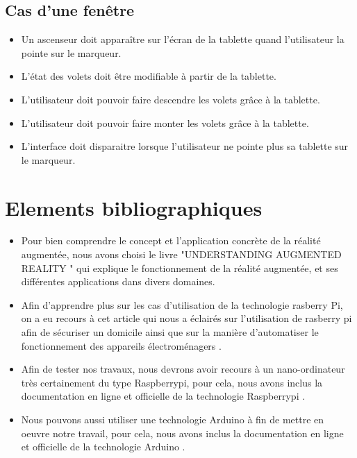 \documentclass[12pt,a4paper]{article}
\begin{document}
\subsection{Cas d'une fenêtre}
\begin{itemize} 
  \item Un ascenseur doit apparaître sur l'écran de la tablette quand l'utilisateur la pointe sur le marqueur.
  \item  L'état des volets doit être modifiable à partir de la tablette.
  \item L'utilisateur doit pouvoir faire descendre les volets grâce à la tablette.
  \item L'utilisateur doit pouvoir faire monter les volets grâce à la tablette.
  \item L'interface doit disparaitre lorsque l'utilisateur ne pointe plus sa tablette sur le marqueur.
\end{itemize}

\newpage
\section{Elements bibliographiques}

\begin{itemize}
  \item Pour bien comprendre le concept et l'application concrète de la réalité augmentée, nous avons choisi le livre "UNDERSTANDING AUGMENTED REALITY "\cite{Ref1} qui explique le fonctionnement de la réalité augmentée, et ses différentes applications dans divers domaines.
  \item Afin d'apprendre plus sur les cas d'utilisation de la technologie rasberry Pi, on a eu recours à cet article qui nous a éclairés sur l'utilisation de rasberry pi afin de sécuriser un domicile ainsi que sur la manière d'automatiser le fonctionnement des appareils \'electrom\'enagers \cite{Ref2}.
  \item Afin de tester nos travaux, nous devrons avoir recours à un nano-ordinateur très certainement du type Raspberrypi, pour cela, nous avons inclus la documentation en ligne et officielle de la technologie Raspberrypi \cite{Ref3}.
  \item Nous pouvons aussi utiliser une technologie Arduino à fin de mettre en oeuvre notre travail, pour cela, nous avons inclus la documentation en ligne et officielle de la technologie Arduino \cite{Ref4}. 
\end{itemize}
\end{document}
